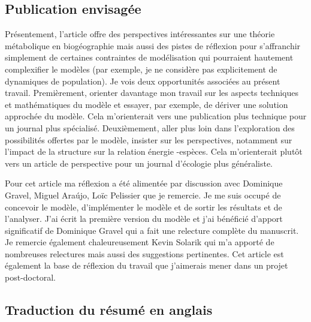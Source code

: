 \subsection{Publication envisagée}

Présentement, l'article offre des perspectives intéressantes sur une
théorie métabolique en biogéographie mais aussi des pistes de réflexion
pour s'affranchir simplement de certaines contraintes de modélisation
qui pourraient hautement complexifier le modèles (par exemple,  je ne considère
pas explicitement de dynamiques de population). Je vois deux opportunités
associées au présent travail. Premièrement, orienter davantage mon travail
sur les aspects techniques et mathématiques du modèle et essayer,
par exemple, de dériver une solution approchée du modèle.
Cela m'orienterait vers une publication plus technique
pour un journal plus spécialisé. Deuxièmement, aller plus loin dans l'exploration
des possibilités offertes par le modèle, insister sur les perspectives, notamment
sur l'impact de la structure sur la relation énergie -espèces. Cela m'orienterait plutôt vers
un article de perspective pour un journal d’écologie plus généraliste.

Pour cet article ma réflexion a été alimentée par discussion avec Dominique Gravel,
Miguel Araújo, Loïc Pelissier que je remercie. Je me suis occupé de concevoir le modèle,
d'implémenter le modèle et de sortir les résultats et de l'analyser.
J'ai écrit la première version du modèle et j'ai bénéficié d'apport significatif
de Dominique Gravel qui a fait une relecture complète du manuscrit. Je remercie
également chaleureusement Kevin Solarik qui m'a apporté de nombreuses
relectures mais aussi des suggestions pertinentes.
Cet article est également la base de réflexion du travail que
j’aimerais mener dans un projet post-doctoral.


\subsection{Traduction du résumé en anglais}

